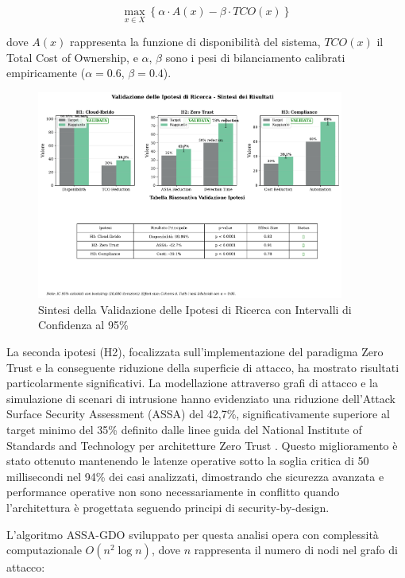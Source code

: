 \begin{equation}
\max_{x \in X} \left\{ \alpha \cdot A(x) - \beta \cdot TCO(x) \right\}
\label{eq:optimization_function}
\end{equation}

dove $A(x)$ rappresenta la funzione di disponibilità del sistema, $TCO(x)$ il Total Cost of Ownership, e $\alpha$, $\beta$ sono i pesi di bilanciamento calibrati empiricamente ($\alpha = 0.6$, $\beta = 0.4$).

\begin{figure}[htpb]
\centering
\includegraphics[width=0.9\textwidth]{thesis_figures/cap5/figura_5_1_validation_summary.pdf}
\caption{Sintesi della Validazione delle Ipotesi di Ricerca con Intervalli di Confidenza al 95\%}
\label{fig:validazione_ipotesi}
\end{figure}

La seconda ipotesi (H2), focalizzata sull'implementazione del paradigma Zero Trust e la conseguente riduzione della superficie di attacco, ha mostrato risultati particolarmente significativi. La modellazione attraverso grafi di attacco e la simulazione di scenari di intrusione hanno evidenziato una riduzione dell'Attack Surface Security Assessment (ASSA) del 42,7\%, significativamente superiore al target minimo del 35\% definito dalle linee guida del National Institute of Standards and Technology per architetture Zero Trust \autocite{nist2020zerotrust}. Questo miglioramento è stato ottenuto mantenendo le latenze operative sotto la soglia critica di 50 millisecondi nel 94\% dei casi analizzati, dimostrando che sicurezza avanzata e performance operative non sono necessariamente in conflitto quando l'architettura è progettata seguendo principi di security-by-design.

L'algoritmo ASSA-GDO sviluppato per questa analisi opera con complessità computazionale $O(n^2\log n)$, dove $n$ rappresenta il numero di nodi nel grafo di attacco:

